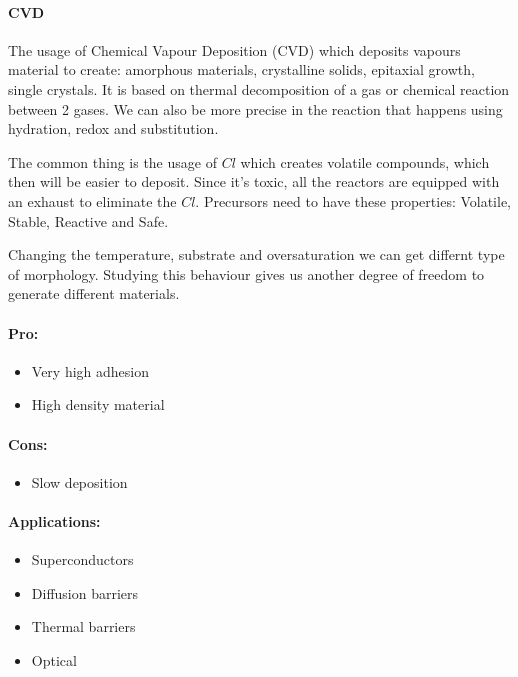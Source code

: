 \paragraph{CVD} The usage of Chemical Vapour Deposition (CVD) which deposits vapours material to create: amorphous materials, crystalline solids, epitaxial growth, single crystals. It is based on thermal decomposition of a gas or chemical reaction between 2 gases. We can also be more precise in the reaction that happens using hydration, redox and substitution.

The common thing is the usage of $Cl$ which creates volatile compounds, which then will be easier to deposit. Since it's toxic, all the reactors are equipped with an exhaust to eliminate the $Cl$. Precursors need to have these properties: Volatile, Stable, Reactive and Safe.

\vspace{15pt}

\noindent Changing the temperature, substrate and oversaturation we can get differnt type of morphology. Studying this behaviour gives us another degree of freedom to generate different materials.

\paragraph{Pro: }
\begin{itemize}
    \item Very high adhesion
    \item High density material
\end{itemize}
\paragraph{Cons: }
\begin{itemize}
    \item Slow deposition
\end{itemize}
\paragraph{Applications: }
\begin{itemize}
    \item Superconductors
    \item Diffusion barriers
    \item Thermal barriers
    \item Optical
\end{itemize}
